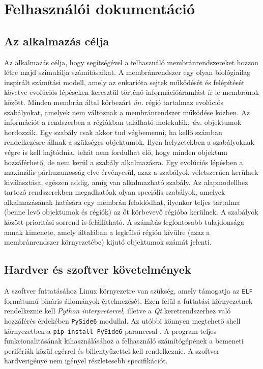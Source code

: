 \chapter{Felhasználói dokumentáció}
\label{ch:user}


\section{Az alkalmazás célja}

Az alkalmazás célja, hogy segítségével a felhasználó membránrendszereket hozzon létre majd szimulálja számításaikat. A membránrendszer egy olyan biológiailag inspirált számítási modell, amely az eukarióta sejtek működését és felépítését követve evolúciós lépéseken keresztül történő információáramlást ír le membránok között. Minden membrán által körbezárt \textit{ún.} régió tartalmaz evolúciós szabályokat, amelyek nem változnak a membránrendszer működése közben. Az információt a rendszerben a régiókban található molekulák, \textit{ún.} objektumok hordozzák. Egy szabály csak akkor tud végbemenni, ha kellő számban rendelkezésre állnak a szükséges objektumok. Ilyen helyzetekben a szabályoknak végre is kell hajtódnia, tehát nem fordulhat elő, hogy minden objektum hozzáférhető, de nem kerül a szabály alkalmazásra. Egy evolúciós lépésben a maximális párhuzamosság elve érvényesül, azaz a szabályok véletszerűen kerülnek kiválasztása, egészen addig, amíg van alkalmazható szabály. Az alapmodellhez tartozó rendszerekben megadhatóak olyan speciális szabályok, amelyek alkalmazásának hatására egy membrán feloldódhat, ilyenkor teljes tartalma (benne levő objektumok és régiók) az őt körbevevő régióba kerülnek. A szabályok között prioritási sorrend is felállítható. A számítás legfontosabb tulajdonsága annak kimenete, amely általában a legkülső régión kívülre (azaz a membránrendszer környezetébe) kijutó objektumok számát jelenti.


\section{Hardver és szoftver követelmények}

A szoftver futtatásához Linux környezetre van szükség, amely támogatja az \verb|ELF| formátumú bináris állományok értelmezését. Ezen felül a futtatási környezetnek rendelkeznie kell \textit{Python interpreterrel}, illetve a \textit{Qt} keretrendszerhez való hozzáférés érdekében \verb|PySide6| modullal. Az utóbbi könnyen megtehető shell környezetben a \verb|pip install PySide6| paranccsal . A program teljes funkcionalitásának kihasználásához a felhasználó számítógépének a bemeneti perifériák közül egérrel és billentyűzettel kell rendelkeznie. A szoftver hardverigénye nem igényel részletesebb specifikációt.


